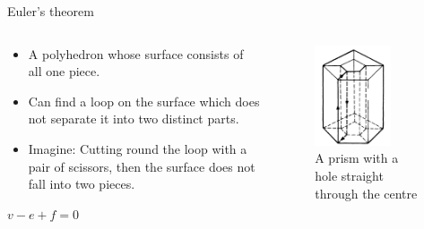 \documentclass{beamer}
\begin{document}
\begin{frame}{Euler's theorem}
  \begin{columns}
    \begin{column}{0.5\textwidth}
      \begin{block}{}
        \begin{itemize}
        \item A polyhedron whose surface consists of all one piece.
        \item Can find a loop on the surface which does not separate it into two distinct parts.
        \item Imagine: Cutting round the loop with a pair of scissors, then the surface does not fall into two pieces.
        \end{itemize}
      \end{block}
      \begin{block}{}
        $v - e + f = 0$
      \end{block}
    \end{column}
    \begin{column}{0.5\textwidth}
      \begin{figure}
        \centering
        \includegraphics[width=0.7\textwidth]{figure_1_3.png}
        \caption{A prism with a hole straight through the centre}
      \end{figure}
    \end{column}
  \end{columns}
\end{frame}
\end{document}
